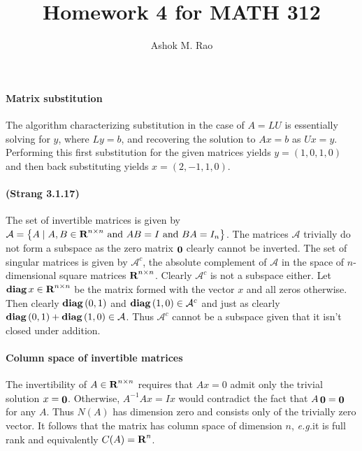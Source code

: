 \documentclass[10pt]{article}
\title{Homework 4 for MATH 312}
\author{Ashok M. Rao}
\newcommand{\reals}{{\mbox{\bf R}}}
\newcommand{\diag}{\mathop{\bf diag}}
\newcommand{\zero}{\mathop{\bf 0}}
\newcommand{\eg}{{\it e.g.}}
\begin{document}
\maketitle
{}


\paragraph{Matrix substitution}
The algorithm characterizing substitution in the case of $A = LU$ is essentially solving for $y$, where $Ly = b$, and recovering the solution to $Ax = b$ as $Ux = y$.  Performing this first substitution for the given matrices yields $y = (1, 0, 1, 0)$ and then back substituting yields $x = (2, -1, 1, 0)$. 
\paragraph{(Strang 3.1.17)}
The set of invertible matrices is given by $\mathcal{A} = \left\{A\mid A, B\in \reals^{n\times n}\text{ and } AB = I \text{ and } BA = I_n\right\}$. The matrices $\mathcal{A}$ trivially do not form a subspace as the zero matrix $\zero$ clearly cannot be inverted. The set of singular matrices is given by $\mathcal{A}^c$, the absolute complement of $\mathcal{A}$ in the space of $n$-dimensional square matrices $\reals^{n\times n}$. Clearly $\mathcal{A}^c$ is not a subspace either. Let $\diag{x}\in\reals^{n\times n}$ be the matrix formed with the vector $x$ and all zeros otherwise. Then clearly $\diag{(0,1)}$ and $\diag{(1,0)}\in\mathcal{A}^c$ and just as clearly $\diag{(0,1)} + \diag{(1,0)} \in \mathcal{A}$. Thus $\mathcal{A}^c$ cannot be a subspace given that it isn't closed under addition. 

\paragraph{Column space of invertible matrices}
The invertibility of $A\in\reals^{n\times n}$ requires that $Ax=0$ admit only the trivial solution $x=\zero$. Otherwise, $A^{-1}Ax = Ix$ would contradict the fact that $A\zero=\zero$ for any $A$. Thus $N(A)$ has dimension zero and consists only of the trivially zero vector.  It follows that the matrix has column space of dimension $n$, \eg it is full rank and equivalently $C(A) = \reals^n$. 
\end{document}
